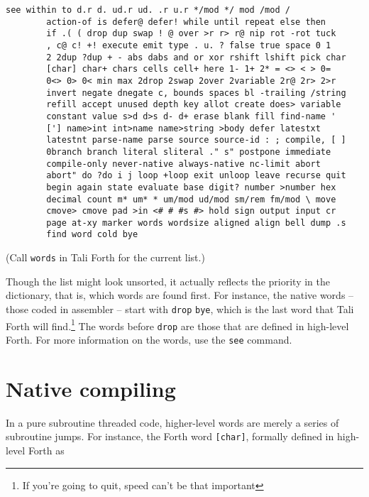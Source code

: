 \begin{lstlisting}[frame=lines]
        see within to d.r d. ud.r ud. .r u.r */mod */ mod /mod /
        action-of is defer@ defer! while until repeat else then
        if .( ( drop dup swap ! @ over >r r> r@ nip rot -rot tuck
        , c@ c! +! execute emit type . u. ? false true space 0 1
        2 2dup ?dup + - abs dabs and or xor rshift lshift pick char
        [char] char+ chars cells cell+ here 1- 1+ 2* = <> < > 0=
        0<> 0> 0< min max 2drop 2swap 2over 2variable 2r@ 2r> 2>r
        invert negate dnegate c, bounds spaces bl -trailing /string
        refill accept unused depth key allot create does> variable
        constant value s>d d>s d- d+ erase blank fill find-name '
        ['] name>int int>name name>string >body defer latestxt
        latestnt parse-name parse source source-id : ; compile, [ ]
        0branch branch literal sliteral ." s" postpone immediate
        compile-only never-native always-native nc-limit abort
        abort" do ?do i j loop +loop exit unloop leave recurse quit
        begin again state evaluate base digit? number >number hex
        decimal count m* um* * um/mod ud/mod sm/rem fm/mod \ move
        cmove> cmove pad >in <# # #s #> hold sign output input cr
        page at-xy marker words wordsize aligned align bell dump .s
        find word cold bye
\end{lstlisting}

(Call \texttt{words} in Tali Forth for the current
list.)

Though the list might look unsorted, it actually reflects the priority in the
dictionary, that is, which words are found first. For
instance, the native words -- those coded in assembler --
start with \texttt{drop}
\texttt{bye}, which is the last word that Tali Forth
will find.\footnote{If you're going to quit, speed can't be that important} The
words before \texttt{drop} are those that are defined in high-level Forth. For
more information on the words, use the \texttt{see}
command.

\section{Native compiling}

In a pure subroutine threaded code, higher-level words are merely a series of
subroutine jumps. For instance, the Forth word
\texttt{[char]}, formally defined in high-level
Forth as

